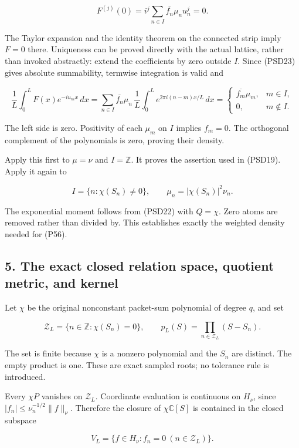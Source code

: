\[
F^{(j)}(0)=i^j\sum_{n\in I}\overline{f_n}\mu_nu_n^j=0.
\tag{PSD25}
\]

The Taylor expansion and the identity theorem on the connected strip imply \(F=0\) there. Uniqueness can be proved directly with the actual lattice, rather than invoked abstractly: extend the coefficients by zero outside \(I\). Since (PSD23) gives absolute summability, termwise integration is valid and

\[
\frac1L\int_0^L F(x)e^{-iu_mx}\,dx
=\sum_{n\in I}\overline{f_n}\mu_n\,
\frac1L\int_0^L e^{2\pi i(n-m)x/L}\,dx
=\begin{cases}\overline{f_m}\mu_m,&m\in I,\\0,&m\notin I.\end{cases}
\tag{PSD26}
\]

The left side is zero. Positivity of each \(\mu_m\) on \(I\) implies \(f_m=0\). The orthogonal complement of the polynomials is zero, proving their density.

Apply this first to \(\mu=\nu\) and \(I=\mathbb Z\). It proves the assertion used in (PSD19). Apply it again to

\[
I=\{n:\chi(S_n)\ne0\},\qquad
\mu_n=|\chi(S_n)|^2\nu_n.
\tag{PSD27}
\]

The exponential moment follows from (PSD22) with \(Q=\chi\). Zero atoms are removed rather than divided by. This establishes exactly the weighted density needed for (P56).

\subsection{5. The exact closed relation space, quotient metric, and kernel}\label{the-exact-closed-relation-space-quotient-metric-and-kernel}

Let \(\chi\) be the original nonconstant packet-sum polynomial of degree \(q\), and set

\[
\mathcal Z_L=\{n\in\mathbb Z:\chi(S_n)=0\},\qquad
p_L(S)=\prod_{n\in\mathcal Z_L}(S-S_n).
\tag{PSD28}
\]

The set is finite because \(\chi\) is a nonzero polynomial and the \(S_n\) are distinct. The empty product is one. These are exact sampled roots; no tolerance rule is introduced.

Every \(\chi P\) vanishes on \(\mathcal Z_L\). Coordinate evaluation is continuous on \(H_\nu\), since \(|f_n|\le\nu_n^{-1/2}\|f\|_\nu\). Therefore the closure of \(\chi \mathbb C[S]\) is contained in the closed subspace

\[
V_L=\{f\in H_\nu:f_n=0\ (n\in\mathcal Z_L)\}.
\]

